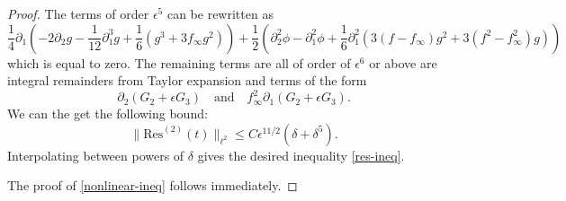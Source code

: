 \begin{proof}
	The terms of order \(\epsilon^5\) can be rewritten as
	\begin{equation}
		\frac 1 4 \partial_1( - 2 \partial_2 g - \frac 1 {12} \partial_1^3 g + \frac 1 6 (g^3 + 3f_\infty g^2)) + \frac 1 2 (\partial_2^2\phi - \partial_1^2\phi + \frac 1 6 \partial_1^2(3(f-f_\infty )g^2 + 3 (f^2-f_\infty^2)g))
	\end{equation}
	which is equal to zero. The remaining terms are all of order of \(\epsilon^6\) or above are integral remainders from Taylor expansion and terms of the form 
	\begin{equation}
		\partial_2(G_2+ \epsilon G_3) \quad \text{and} \quad f_\infty^2 \partial_1(G_2 + \epsilon G_3).
	\end{equation}
	We can the get the following bound: \[\| \mathrm{Res}^{(2)}(t) \|_{\ell^2} \leq C \epsilon^{11/2} (\delta + \delta^5).\] Interpolating between powers of \(\delta\) gives the desired inequality \cref{res-ineq}.
	
	The proof of \cref{nonlinear-ineq} follows immediately.
\end{proof}


